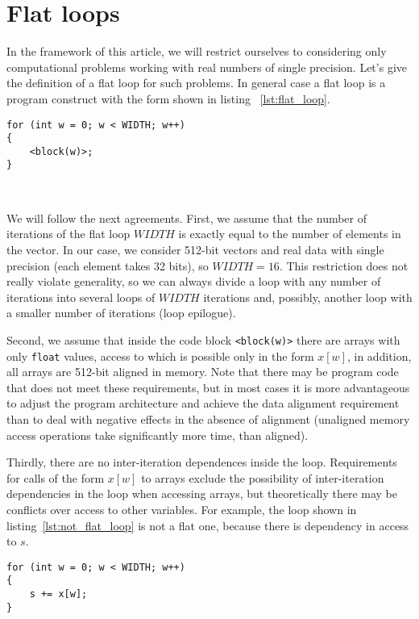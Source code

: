 \documentclass[
11pt,%
tightenlines,%
twoside,%
onecolumn,%
nofloats,%
nobibnotes,%
nofootinbib,%
superscriptaddress,%
noshowpacs,%
centertags]%
{revtex4}
\begin{document}
\section{Flat loops}

In the framework of this article, we will restrict ourselves to considering only computational problems working with real numbers of single precision.
Let's give the definition of a flat loop for such problems.
In general case a flat loop is a program construct with the form shown in listing ~\ref{lst:flat_loop}.

\begin{lstlisting}[caption={General view of a flat loop.},label={lst:flat_loop}]
for (int w = 0; w < WIDTH; w++)
{
    <block(w)>;
}
\end{lstlisting}

\

We will follow the next agreements.
First, we assume that the number of iterations of the flat loop $WIDTH$ is exactly equal to the number of elements in the vector.
In our case, we consider 512-bit vectors and real data with single precision (each element takes 32 bits), so $WIDTH = 16$.
This restriction does not really violate generality, so we can always divide a loop with any number of iterations into several loops of $WIDTH$ iterations and, possibly, another loop with a smaller number of iterations (loop epilogue).

Second, we assume that inside the code block \texttt{<block(w)>} there are arrays with only \texttt{float} values, access to which is possible only in the form $x[w]$, in addition, all arrays are 512-bit aligned in memory.
Note that there may be program code that does not meet these requirements, but in most cases it is more advantageous to adjust the program architecture and achieve the data alignment requirement than to deal with negative effects in the absence of alignment (unaligned memory access operations take significantly more time, than aligned).

Thirdly, there are no inter-iteration dependences inside the loop.
Requirements for calls of the form $x[w]$ to arrays exclude the possibility of inter-iteration dependencies in the loop when accessing arrays, but theoretically there may be conflicts over access to other variables.
For example, the loop shown in listing~\ref{lst:not_flat_loop} is not a flat one, because there is dependency in access to $s$.
\begin{lstlisting}[caption={Simple example of a non-flat loop.},label={lst:not_flat_loop}]
for (int w = 0; w < WIDTH; w++)
{
    s += x[w];
}
\end{lstlisting}
\end{document}
